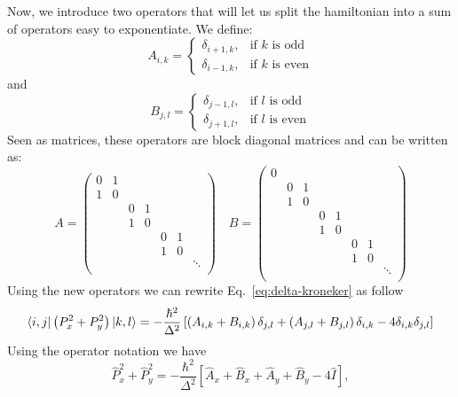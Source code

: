 Now, we introduce two operators that will let us split the hamiltonian into a sum of operators easy to exponentiate. We define:
\begin{equation}
A_{i,k} = \begin{cases} \delta_{i+1,k}, & \mbox{if } k\mbox{ is odd} \\ \delta_{i-1,k}, & \mbox{if } k\mbox{ is even} \end{cases}
\end{equation}
and
\begin{equation} 
B_{j,l} = \begin{cases} \delta_{j-1,l}, & \mbox{if } l\mbox{ is odd} \\ \delta_{j+1,l}, & \mbox{if } l\mbox{ is even} \end{cases}
\end{equation}
Seen as matrices, these operators are block diagonal matrices and can be written as:
\begin{equation}
A = \begin{pmatrix}
0 & 1 \\
1 & 0 \\
 & & 0 & 1 \\
 & & 1 & 0 \\
 & & & & 0 & 1 \\
 & & & & 1 & 0 \\
 & & & &  & & \ddots \\
\end{pmatrix}
\quad B = \begin{pmatrix}
0 \\
& 0 & 1 \\
& 1 & 0 \\
& & & 0 & 1 \\
& & & 1 & 0 \\
& & & & & 0 & 1 \\
& & & & & 1 & 0 \\
& & & & &  & & \ddots \\
\end{pmatrix}
\end{equation}
Using the new operators we can rewrite Eq.~\eqref{eq:delta-kroneker} as follow
\begin{equation}
\bra{i,j} \left( P_x^2 + P_y^2 \right) \ket{k,l} = -\frac{\hbar^2}{\Delta^2} \left[ \left( A_{i,k} + B_{i,k} \right) \delta_{j,l} + \left( A_{j,l} + B_{j,l} \right) \delta_{i,k} - 4 \delta_{i,k} \delta_{j,l} \right]
\end{equation}
Using the operator notation we have
\begin{equation} \label{eq:mom-decomposition}
\hat{P}_x^2 + \hat{P}_y^2 = -\frac{\hbar^2}{\Delta^2} \left[ \hat{A}_x + \hat{B}_x + \hat{A}_y + \hat{B}_y - 4 \hat{I} \right],
\end{equation}
